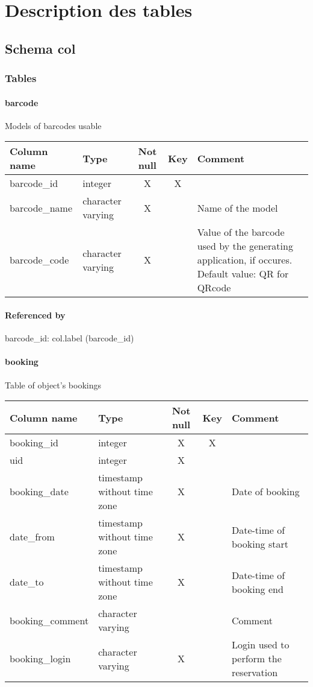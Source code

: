 \section{Description des tables}

\subsection{Schema col}
\subsubsection{Tables}
\paragraph{barcode}
Models of barcodes usable

\begin{tabular}{|l| p{2cm}|c|c| p{5cm}|}
\hline
Column name & Type & Not null & Key & Comment \\
\hline
barcode\_id & integer & X & X & \\
barcode\_name & character varying & X &  & Name of the model\\
barcode\_code & character varying & X &  & Value of the barcode used by the generating application, if occures. Default value: QR for QRcode\\
\hline
\end{tabular}
\paragraph{Referenced by}
barcode\_id: col.label (barcode\_id)

\paragraph{booking}
Table of object's bookings

\begin{tabular}{|l| p{2cm}|c|c| p{5cm}|}
\hline
Column name & Type & Not null & Key & Comment \\
\hline
booking\_id & integer & X & X & \\
uid & integer & X &  & \\
booking\_date & timestamp without time zone & X &  & Date of booking\\
date\_from & timestamp without time zone & X &  & Date-time of booking start\\
date\_to & timestamp without time zone & X &  & Date-time of booking end\\
booking\_comment & character varying &  &  & Comment\\
booking\_login & character varying & X &  & Login used to perform the reservation\\
\hline
\end{tabular}
